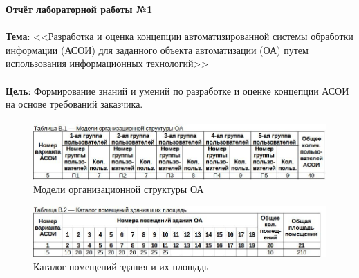 \documentclass[12pt, a4paper, simple]{eskdtext}
\def \gpiDocNum {1}
\def \gpiTopicRep {Разработка и оценка концепции автоматизированной системы обработки информации (АСОИ)
для заданного объекта автоматизации (ОА) путем использования информационных технологий}
\def \gpiDocTopic {Отчёт лабораторной работы №\gpiDocNum}
\begin{document}
    
    \thispagestyle{plain}
    \pagestyle{plain}

    \begin{center}
        \textbf{\gpiDocTopic}
    \end{center}

    \paragraph{} \textbf{Тема}: <<\gpiTopicRep>>

    \paragraph{} \textbf{Цель}:
    Формирование знаний и умений по разработке и оценке концепции АСОИ на основе требований заказчика.



    \paragraph{} \hspace{0pt}

    \begin{figure}[h!]
        \centering
        \includegraphics[width=14cm]
            {_docs/ТаблицаВ1МоделиОрганизационнойСтруктурыОА.jpg}
        \caption{Модели организационной структуры ОА}
    \end{figure}

    \begin{figure}[h!]
        \centering
        \includegraphics[width=14cm]
            {_docs/ТаблицаВ2КаталогПомещенийЗданияИИхПлощадь.jpg}
        \caption{Каталог помещений здания и их площадь}
    \end{figure}
\end{document}
